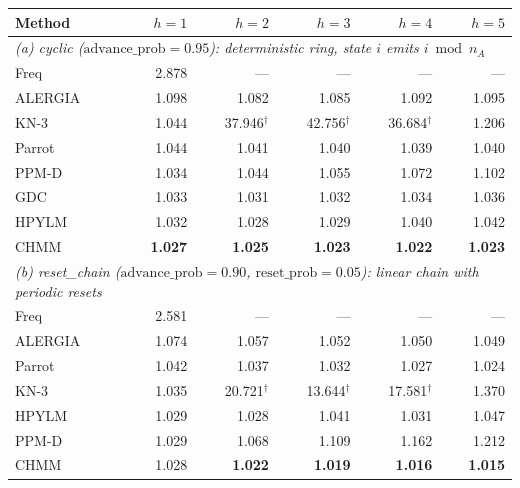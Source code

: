 \begin{table}[t]
\label{tab:hmm_forecasting}
\small
\begin{tabular}{l r r r r r}
\toprule
Method & $h{=}1$ & $h{=}2$ & $h{=}3$ & $h{=}4$ & $h{=}5$ \\
\midrule
\multicolumn{6}{l}{\emph{(a) cyclic ($\mathrm{advance\_prob}{=}0.95$): deterministic ring, state $i$ emits $i \bmod n_A$}} \\
Freq    & 2.878          & ---            & ---            & ---            & ---            \\
ALERGIA & 1.098          & 1.082          & 1.085          & 1.092          & 1.095          \\
KN-3    & 1.044          & 37.946$^\dagger$ & 42.756$^\dagger$ & 36.684$^\dagger$ & 1.206          \\
Parrot  & 1.044          & 1.041          & 1.040          & 1.039          & 1.040          \\
PPM-D   & 1.034          & 1.044          & 1.055          & 1.072          & 1.102          \\
GDC     & 1.033          & 1.031          & 1.032          & 1.034          & 1.036          \\
HPYLM   & 1.032          & 1.028          & 1.029          & 1.040          & 1.042          \\
CHMM    & \textbf{1.027} & \textbf{1.025} & \textbf{1.023} & \textbf{1.022} & \textbf{1.023} \\
\midrule
\multicolumn{6}{l}{\emph{(b) reset\_chain ($\mathrm{advance\_prob}{=}0.90$, $\mathrm{reset\_prob}{=}0.05$): linear chain with periodic resets}} \\
Freq    & 2.581          & ---            & ---            & ---            & ---            \\
ALERGIA & 1.074          & 1.057          & 1.052          & 1.050          & 1.049          \\
Parrot  & 1.042          & 1.037          & 1.032          & 1.027          & 1.024          \\
KN-3    & 1.035          & 20.721$^\dagger$ & 13.644$^\dagger$ & 17.581$^\dagger$ & 1.370          \\
HPYLM   & 1.029          & 1.028          & 1.041          & 1.031          & 1.047          \\
PPM-D   & 1.029          & 1.068          & 1.109          & 1.162          & 1.212          \\
CHMM    & 1.028          & \textbf{1.022} & \textbf{1.019} & \textbf{1.016} & \textbf{1.015} \\

\end{tabular}
\end{table}
